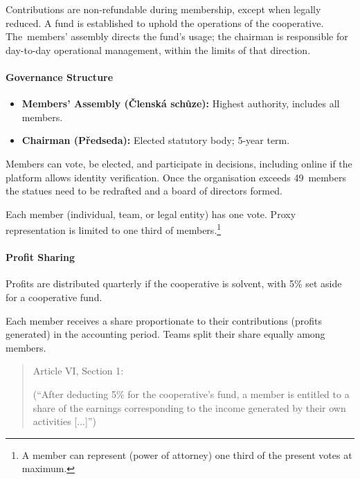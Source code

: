 Contributions are non-refundable during membership, except when legally reduced. A fund is established to uphold the operations of the cooperative. The~members’ assembly directs the fund’s usage; the chairman is responsible for day-to-day operational management, within the limits of that direction.

\paragraph{Governance Structure}
\begin{itemize}
    \item \textbf{Members’ Assembly (Členská schůze):} Highest authority, includes all members.
    \item \textbf{Chairman (Předseda):} Elected statutory body; 5-year term.
\end{itemize}
Members can vote, be elected, and participate in decisions, including online if the platform allows identity verification. Once the organisation exceeds 49~members the statues need to be redrafted and a board of directors formed.

Each member (individual, team, or legal entity) has one vote. Proxy representation is limited to one third of members.\footnote{A member can represent (power of attorney) one third of the present votes at maximum.}
\paragraph{Profit Sharing}
Profits are distributed quarterly if the cooperative is solvent, with 5\% set aside for a cooperative fund.

Each member receives a share proportionate to their contributions (profits generated) in the accounting period. Teams split their share equally among members.
\begin{quote}
    Article VI, Section 1: 

    (\enquote{After deducting 5\% for the cooperative’s fund, a member is entitled to a share of the earnings corresponding to the income generated by their own activities [...]})
\end{quote}

